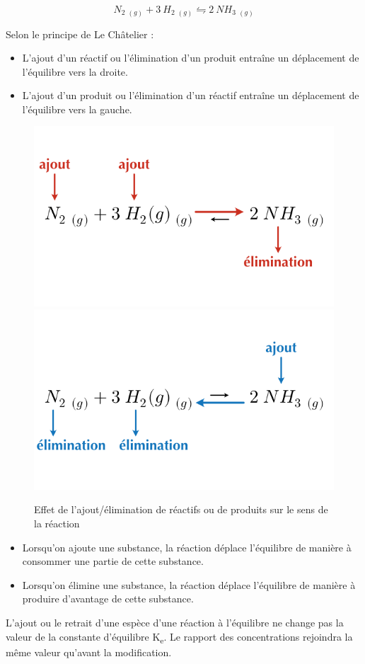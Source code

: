 \documentclass[
  11pt,
  a4paper,
  openany]{book}
\providecommand{\tightlist}{%
  \setlength{\itemsep}{0pt}\setlength{\parskip}{0pt}}
\begin{document}
\[
N_2\ _{(g)} + 3\ H_2\ _{(g)} \leftrightharpoons 2\ NH_3\ _{(g)}
\]

Selon le principe de Le Châtelier :

\begin{itemize}
\tightlist
\item
  L'ajout d'un réactif ou l'élimination d'un produit entraîne un déplacement de l'équilibre vers la droite.
\item
  L'ajout d'un produit ou l'élimination d'un réactif entraîne un déplacement de l'équilibre vers la gauche.
\end{itemize}

\begin{figure}

{\centering \includegraphics[width=0.45\linewidth]{images/equilibres-concentrations-2a} \includegraphics[width=0.45\linewidth]{images/equilibres-concentrations-2b} 

}

\caption{Effet de l'ajout/élimination de réactifs ou de produits sur le sens de la réaction}\label{fig:equilibres-concentrations-2}
\end{figure}

\begin{itemize}
\tightlist
\item
  Lorsqu'on ajoute une substance, la réaction déplace l'équilibre de manière à consommer une partie de cette substance.
\item
  Lorsqu'on élimine une substance, la réaction déplace l'équilibre de manière à produire d'avantage de cette substance.
\end{itemize}

L'ajout ou le retrait d'une espèce d'une réaction à l'équilibre ne change pas la valeur de la constante d'équilibre K\textsubscript{e}. Le rapport des concentrations rejoindra la même valeur qu'avant la modification.
\end{document}
